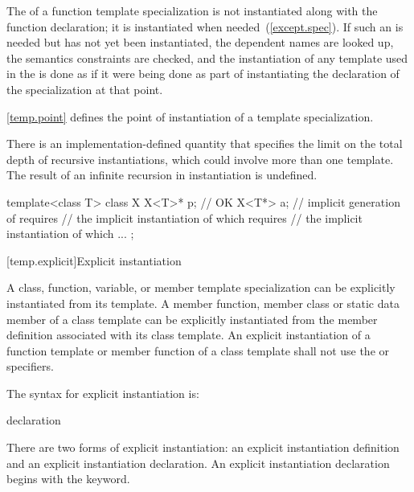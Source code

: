 \pnum
The  of a function template specialization
is not instantiated along with the function declaration; it is instantiated
when needed~(\ref{except.spec}). If such an
 is needed but has not yet been
instantiated, the dependent names are looked up, the semantics constraints are
checked, and the instantiation of any template used in the
 is done as if it were being done as part
of instantiating the declaration of the specialization at that point.

\pnum
\enternote
\ref{temp.point} defines the point of instantiation of a template specialization.
\exitnote

\pnum
There is an implementation-defined quantity that specifies the limit on
the total depth of recursive instantiations, which could involve more than one
template.
The result of an infinite recursion in instantiation is undefined.
\enterexample

\begin{codeblock}
template<class T> class X {
  X<T>* p;          // OK
  X<T*> a;          // implicit generation of  requires
                    // the implicit instantiation of  which requires
                    // the implicit instantiation of  which ...
};
\end{codeblock}
\exitexample

[temp.explicit]{Explicit instantiation}

\pnum
{}%
A class, function, variable, or member template specialization can be explicitly
instantiated from its template.
A member function, member class or static data member of a class template can
be explicitly instantiated from the member definition associated with its class
template. An explicit instantiation of a function template
or member function of a class template
shall not
use the  or  specifiers.

\pnum
The syntax for explicit instantiation is:

\begin{bnf}
\br
    declaration
\end{bnf}

There are two forms of explicit instantiation: an explicit instantiation
definition and an explicit instantiation declaration. An explicit instantiation
declaration begins with the  keyword.

